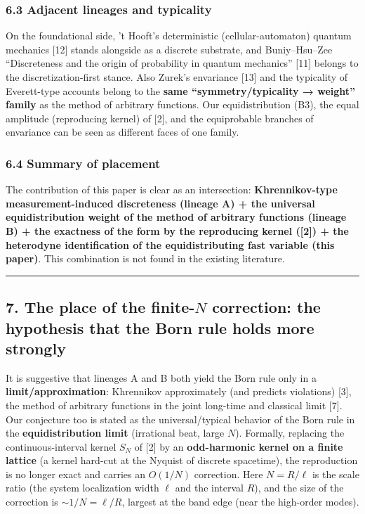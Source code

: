 \documentclass[
]{ltjsarticle}
\begin{document}
\subsubsection{6.3 Adjacent lineages and
typicality}\label{adjacent-lineages-and-typicality}

On the foundational side, 't Hooft's deterministic (cellular-automaton)
quantum mechanics {[}12{]} stands alongside as a discrete substrate, and
Buniy--Hsu--Zee ``Discreteness and the origin of probability in quantum
mechanics'' {[}11{]} belongs to the discretization-first stance. Also
Zurek's envariance {[}13{]} and the typicality of Everett-type accounts
belong to the \textbf{same ``symmetry/typicality → weight'' family} as
the method of arbitrary functions. Our equidistribution (B3), the equal
amplitude (reproducing kernel) of {[}2{]}, and the equiprobable branches
of envariance can be seen as different faces of one family.

\subsubsection{6.4 Summary of placement}\label{summary-of-placement}

The contribution of this paper is clear as an intersection:
\textbf{Khrennikov-type measurement-induced discreteness (lineage A) +
the universal equidistribution weight of the method of arbitrary
functions (lineage B) + the exactness of the form by the reproducing
kernel ({[}2{]}) + the heterodyne identification of the equidistributing
fast variable (this paper)}. This combination is not found in the
existing literature.

\begin{center}\rule{0.5\linewidth}{0.5pt}\end{center}

\subsection{\texorpdfstring{7. The place of the finite-\(N\) correction:
the hypothesis that the Born rule holds more
strongly}{7. The place of the finite-N correction: the hypothesis that the Born rule holds more strongly}}\label{the-place-of-the-finite-n-correction-the-hypothesis-that-the-born-rule-holds-more-strongly}

It is suggestive that lineages A and B both yield the Born rule only in
a \textbf{limit/approximation}: Khrennikov approximately (and predicts
violations) {[}3{]}, the method of arbitrary functions in the joint
long-time and classical limit {[}7{]}. Our conjecture too is stated as
the universal/typical behavior of the Born rule in the
\textbf{equidistribution limit} (irrational beat, large \(N\)).
Formally, replacing the continuous-interval kernel \(S_N\) of {[}2{]} by
an \textbf{odd-harmonic kernel on a finite lattice} (a kernel hard-cut
at the Nyquist of discrete spacetime), the reproduction is no longer
exact and carries an \(O(1/N)\) correction. Here \(N=R/\ell\) is the
scale ratio (the system localization width \(\ell\) and the interval
\(R\)), and the size of the correction is \(\sim1/N=\ell/R\), largest at
the band edge (near the high-order modes).
\end{document}
